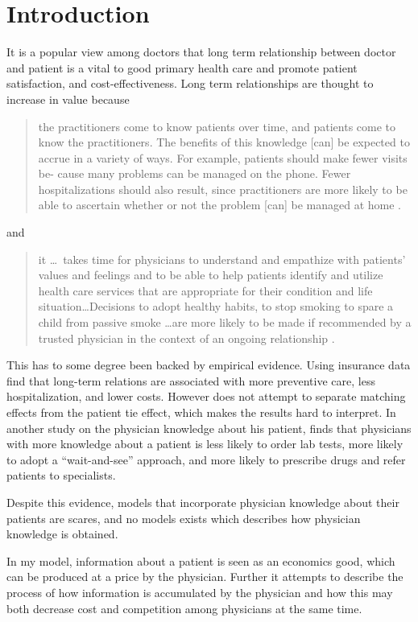 \documentclass[10pt,a4paper]{article}
\begin{document}
\section{Introduction}
It is a popular view among doctors that long term relationship between doctor and patient is a vital to good primary health care and promote patient satisfaction, and cost-effectiveness. Long term relationships are thought to increase in value because
\begin{quotation}
the practitioners come to know patients over time, and patients come to know the practitioners. The benefits of this knowledge [can] be expected to accrue in a variety of ways. For example, patients should make fewer visits be- cause many problems can be managed on the phone. Fewer hospitalizations should also result, since practitioners are more likely to be able to ascertain whether or not the problem [can] be managed at home \parencite[p. 41--42]{Starfield1992}.
\end{quotation}
and
\begin{quotation}
it \ldots \ takes time for physicians to understand and empathize with patients' values and feelings and to be able to help patients identify and utilize health care services that are appropriate for their condition and life situation\ldots Decisions to adopt healthy habits, to stop smoking to spare a child from passive smoke \ldots are more likely to be made if recommended by a trusted physician in the context of an ongoing relationship \parencite[p. 324--235]{Emanuel1995}.
\end{quotation}
This has to some degree been backed by empirical evidence. Using insurance data \textcite{Weiss1996} find that long-term relations are associated with more preventive care, less hospitalization, and lower costs. However \citeauthor{Weiss1996} does not attempt to separate matching effects from the patient tie effect, which makes the results hard to interpret. In another study on the physician knowledge about his patient,   \textcite{Hjortdahl1991}  finds that physicians with more knowledge about a patient is less likely to order lab tests, more likely to adopt a ``wait-and-see'' approach, and more likely to prescribe drugs and refer patients to specialists.

Despite this evidence, models that incorporate physician knowledge about their patients are scares, and no models exists which describes how physician knowledge is obtained.

In my model, information about a patient is seen as an economics good, which can be produced at a price by the physician. Further it attempts to describe the process of how information is accumulated by the physician and how this may both decrease cost and competition among physicians at the same time.
\end{document}
